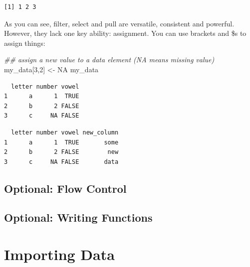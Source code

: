 \documentclass[
  letterpaper,
  DIV=11,
  numbers=noendperiod]{scrreprt}
\newenvironment{Shaded}{\begin{snugshade}}{\end{snugshade}}
\newcommand{\ConstantTok}[1]{\textcolor[rgb]{0.56,0.35,0.01}{#1}}
\newcommand{\DecValTok}[1]{\textcolor[rgb]{0.68,0.00,0.00}{#1}}
\newcommand{\DocumentationTok}[1]{\textcolor[rgb]{0.37,0.37,0.37}{\textit{#1}}}
\newcommand{\FunctionTok}[1]{\textcolor[rgb]{0.28,0.35,0.67}{#1}}
\newcommand{\NormalTok}[1]{\textcolor[rgb]{0.00,0.23,0.31}{#1}}
\newcommand{\OtherTok}[1]{\textcolor[rgb]{0.00,0.23,0.31}{#1}}
\newcommand{\SpecialCharTok}[1]{\textcolor[rgb]{0.37,0.37,0.37}{#1}}
\newcommand{\StringTok}[1]{\textcolor[rgb]{0.13,0.47,0.30}{#1}}
\begin{document}
\begin{verbatim}
[1] 1 2 3
\end{verbatim}

As you can see, filter, select and pull are versatile, consistent and
powerful. However, they lack one key ability: assignment. You can use
brackets and \$s to assign things:

\begin{Shaded}
\begin{Highlighting}[]
\DocumentationTok{\#\# assign a new value to a data element (NA means missing value)}
\NormalTok{my\_data[}\DecValTok{3}\NormalTok{,}\DecValTok{2}\NormalTok{] }\OtherTok{\textless{}{-}} \ConstantTok{NA}
\NormalTok{my\_data}
\end{Highlighting}
\end{Shaded}

\begin{verbatim}
  letter number vowel
1      a      1  TRUE
2      b      2 FALSE
3      c     NA FALSE
\end{verbatim}

\begin{Shaded}
\end{Shaded}

\begin{verbatim}
  letter number vowel new_column
1      a      1  TRUE       some
2      b      2 FALSE        new
3      c     NA FALSE       data
\end{verbatim}

\section{Optional: Flow Control}\label{optional-flow-control}

\section{Optional: Writing Functions}\label{optional-writing-functions}

\chapter{Importing Data}\label{importing-data}
\end{document}
